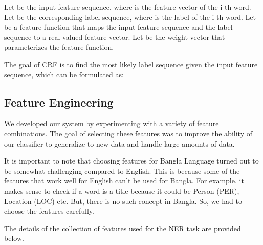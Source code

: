 \documentclass{article}
\begin{document}
Let  be the input feature sequence, where  is the feature vector of the i-th word.
Let  be the corresponding label sequence, where  is the label of the i-th word.
Let  be a feature function that maps the input feature sequence and the label sequence to a real-valued feature vector.
Let  be the weight vector that parameterizes the feature function.

The goal of CRF is to find the most likely label sequence given the input feature sequence, which can be formulated as:



\subsection{Feature Engineering}

We developed our system by experimenting with a variety of feature combinations. The goal of selecting these features was to improve the ability of our classifier to generalize to new data and handle large amounts of data.

It is important to note that choosing features for Bangla Language turned out to be somewhat challenging compared to English. This is because some of the features that work well for English can't be used for Bangla. For example, it makes sense to check if a word is a title because it could be Person (PER), Location (LOC) etc. But, there is no such concept in Bangla. So, we had to choose the features carefully. 

The details of the collection of features used for the NER task are provided below.
\end{document}

